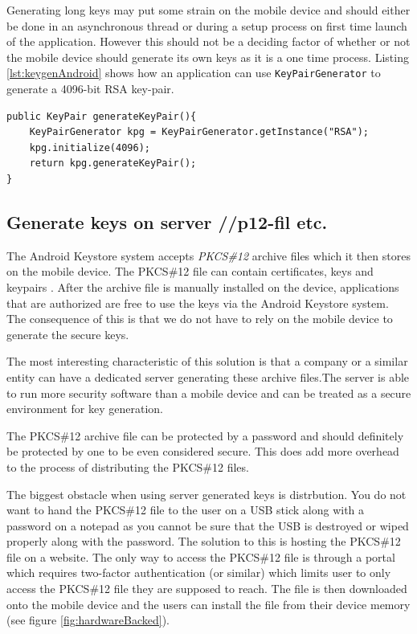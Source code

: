 Generating long keys may put some strain on the mobile device and should either be done in an asynchronous thread or during a setup process on first time launch of the application. However this should not be a deciding factor of whether or not the mobile device should generate its own keys as it is a one time process. Listing \ref{lst:keygenAndroid} shows how an application can use \texttt{KeyPairGenerator} to generate a 4096-bit RSA key-pair.

\begin{lstlisting}[caption=Generating RSA key-pair on Android device using KeyPairGenerator, label=lst:keygenAndroid,escapechar=å]
public KeyPair generateKeyPair(){
    KeyPairGenerator kpg = KeyPairGenerator.getInstance("RSA");
    kpg.initialize(4096);
    return kpg.generateKeyPair();
}
\end{lstlisting}

\subsection{Generate keys on server //p12-fil etc.}
\label{sec:generateKeysOnServer}
The Android Keystore system accepts \textit{PKCS\#12} archive files which it then stores on the mobile device. The PKCS\#12 file can contain certificates, keys and keypairs \cite{pkcs12}. After the archive file is manually installed on the device, applications that are authorized are free to use the keys via the Android Keystore system. The consequence of this is that we do not have to rely on the mobile device to generate the secure keys.

The most interesting characteristic of this solution is that a company or a similar entity can have a dedicated server generating these archive files.The server is able to run more security software than a mobile device and can be treated as a secure environment for key generation.

The PKCS\#12 archive file can be protected by a password and should definitely be protected by one to be even considered secure. This does add more overhead to the process of distributing the PKCS\#12 files.

The biggest obstacle when using server generated keys is distrbution. You do not want to hand the PKCS\#12 file to the user on a USB stick along with a password on a notepad as you cannot be sure that the USB is destroyed or wiped properly along with the password. The solution to this is hosting the PKCS\#12 file on a website. The only way to access the PKCS\#12 file is through a portal which requires two-factor authentication (or similar) which limits user to only access the PKCS\#12 file they are supposed to reach. The file is then downloaded onto the mobile device and the users can install the file from their device memory (see figure \ref{fig:hardwareBacked}).

